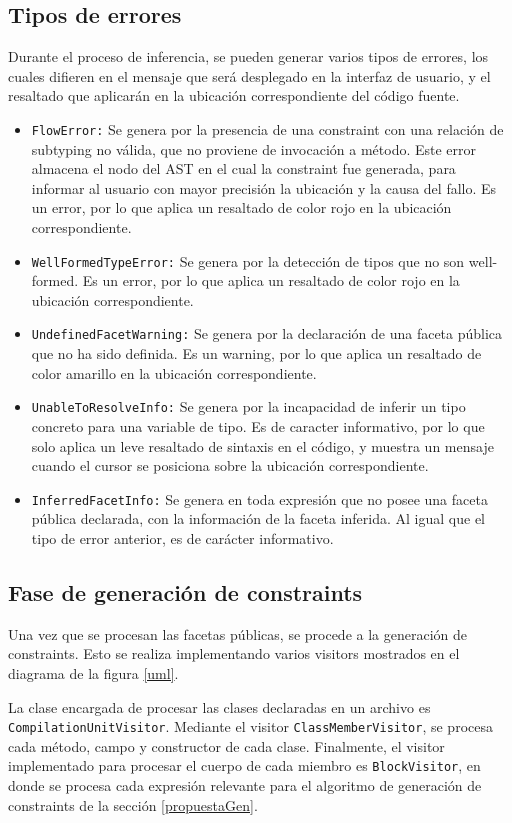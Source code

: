 \subsection{Tipos de errores}
Durante el proceso de inferencia, se pueden generar varios tipos de errores, los cuales difieren en el mensaje que será desplegado en la interfaz de usuario, y el resaltado que aplicarán en la ubicación correspondiente del código fuente.

\begin{itemize}
  \item \texttt{FlowError:} Se genera por la presencia de una constraint con una relación de subtyping no válida, que no proviene de invocación a método. Este error almacena el nodo del AST en el cual la constraint fue generada, para informar al usuario con mayor precisión la ubicación y la causa del fallo. Es un error, por lo que aplica un resaltado de color rojo en la ubicación correspondiente.
  \item \texttt{WellFormedTypeError:} Se genera por la detección de tipos que no son well-formed. Es un error, por lo que aplica un resaltado de color rojo en la ubicación correspondiente.
  \item \texttt{UndefinedFacetWarning:} Se genera por la declaración de una faceta pública que no ha sido definida. Es un warning, por lo que aplica un resaltado de color amarillo en la ubicación correspondiente.
  \item \texttt{UnableToResolveInfo:} Se genera por la incapacidad de inferir un tipo concreto para una variable de tipo. Es de caracter informativo, por lo que solo aplica un leve resaltado de sintaxis en el código, y muestra un mensaje cuando el cursor se posiciona sobre la ubicación correspondiente.
  \item \texttt{InferredFacetInfo:} Se genera en toda expresión que no posee una faceta pública declarada, con la información de la faceta inferida. Al igual que el tipo de error anterior, es de carácter informativo.
\end{itemize}

\subsection{Fase de generación de constraints}
Una vez que se procesan las facetas públicas, se procede a la generación de constraints. Esto se realiza implementando varios visitors mostrados en el diagrama de la figura \ref{uml}.

La clase encargada de procesar las clases declaradas en un archivo es \texttt{CompilationUnitVisitor}. Mediante el visitor \texttt{ClassMemberVisitor}, se procesa cada método, campo y constructor de cada clase. Finalmente, el visitor implementado para procesar el cuerpo de cada miembro es \texttt{BlockVisitor}, en donde se procesa cada expresión relevante para el algoritmo de generación de constraints de la sección \ref{propuestaGen}.

